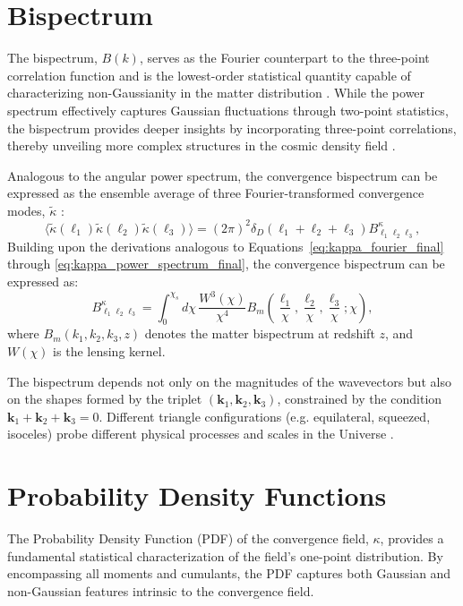 \section{Bispectrum}
The bispectrum, \( B(k) \), serves as the Fourier counterpart to the three-point correlation function and is the lowest-order statistical quantity capable of characterizing non-Gaussianity in the matter distribution \citep{2002PhR...367....1B}. While the power spectrum effectively captures Gaussian fluctuations through two-point statistics, the bispectrum provides deeper insights by incorporating three-point correlations, thereby unveiling more complex structures in the cosmic density field \citep{1999ApJ...517..531S, 2004MNRAS.348..897T}.

Analogous to the angular power spectrum, the convergence bispectrum can be expressed as the ensemble average of three Fourier-transformed convergence modes, \( \tilde{\kappa} \) \citep{2005PhRvD..72h3001D}:
\begin{equation}
    \langle \tilde{\kappa}(\mathbf{\ell}_1) \tilde{\kappa}(\mathbf{\ell}_2) \tilde{\kappa}(\mathbf{\ell}_3) \rangle = (2\pi)^2 \delta_{D}(\mathbf{\ell}_1 + \mathbf{\ell}_2 + \mathbf{\ell}_3) B^\kappa_{\ell_1 \ell_2 \ell_3},
    \label{eq:convergence_bispectrum_def}
\end{equation}
Building upon the derivations analogous to Equations~\eqref{eq:kappa_fourier_final} through \eqref{eq:kappa_power_spectrum_final}, the convergence bispectrum can be expressed as:
\begin{equation}
    B_{\ell_1 \ell_2 \ell_3}^\kappa = \int_0^{\chi_s} d\chi \, \frac{W^3(\chi)}{\chi^4} B_m\left( \frac{\ell_1}{\chi}, \frac{\ell_2}{\chi}, \frac{\ell_3}{\chi}; \chi \right),
    \label{eq:convergence_bispectrum}
\end{equation}
where \( B_m(k_1, k_2, k_3, z) \) denotes the matter bispectrum at redshift \( z \), and \( W(\chi) \) is the lensing kernel. 

The bispectrum depends not only on the magnitudes of the wavevectors but also on the shapes formed by the triplet \( (\boldsymbol{k}_1, \boldsymbol{k}_2, \boldsymbol{k}_3) \), constrained by the condition \( \boldsymbol{k}_1 + \boldsymbol{k}_2 + \boldsymbol{k}_3 = 0 \). Different triangle configurations (e.g. equilateral, squeezed, isoceles) probe different physical processes and scales in the Universe \citep{2005PhRvD..72h3001D}.

\section{Probability Density Functions} \label{sec:pdfs}
The Probability Density Function (PDF) of the convergence field, $\kappa$, provides a fundamental statistical characterization of the field's one-point distribution. By encompassing all moments and cumulants, the PDF captures both Gaussian and non-Gaussian features intrinsic to the convergence field.


